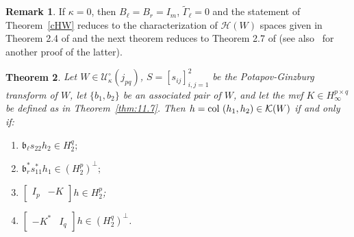 \documentclass[12pt,twoside,a4paper]{amsart}
\newtheorem{thm}{Theorem}[section]
\theoremstyle{definition}
\newtheorem{remark}[thm]{Remark}
\numberwithin{equation}{section}
\begin{document}
\begin{remark}
If $\kappa=0$, then $B_{\ell}=B_r=I_m$, ${{{\widetilde \Gamma} }}_{\ell}=0$ and the
statement of Theorem~\ref{cHW} reduces to the characterization of
${{\mathcal H}}(W)$ spaces given in Theorem 2.4 of \cite{D89} and the next
theorem reduces to Theorem 2.7 of \cite{D89} (see
also~\cite{Arva} for another proof of the latter).
\end{remark}
\begin{thm}\label{thm:11.11}
    Let $W\in {{\mathcal U}}_\kappa^\circ(j_{pq})$,
$S=[s_{ij}]_{i,j=1}^2$ be the   Potapov-Ginzburg transform
of $W$,  let $\{b_1, b_2\}$ be an associated pair of $W$, and let
the mvf $K\in H_\infty^{p\times q}$ be defined as in
Theorem~\ref{thm:11.7}. Then $h=\textup{col }(h_1,h_2)\in{{\mathcal K}}(W)$ if
and only if:
\begin{enumerate}
\item[\rm(1)]
${{\mathfrak b}}_\ell s_{22}h_2\in H_2^q;$ \vskip 6pt
\item[\rm(2)]
${{\mathfrak b}}_r^*s_{11}^*h_1\in (H_2^p)^\perp;$ \vskip 6pt
\item[\rm(3)]
$\begin{bmatrix}I_p & -K \end{bmatrix}h\in H_2^p$; \vskip 6pt
\item[\rm(4)] $\begin{bmatrix} -K^*&I_q\end{bmatrix}h\in (H_2^q)^\perp$.
\end{enumerate}
\end{thm}
\end{document}
